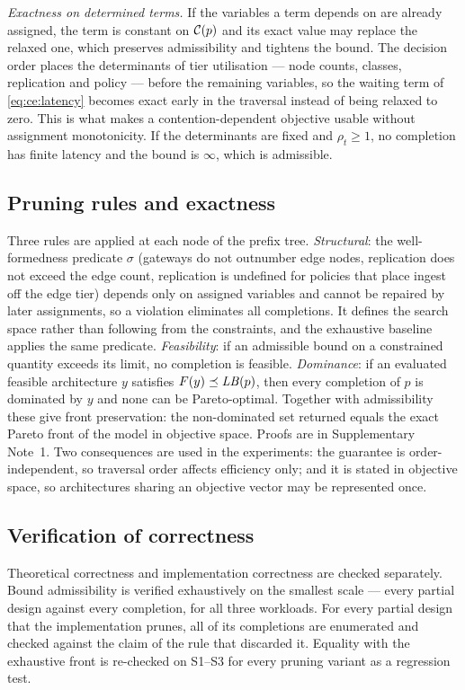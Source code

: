 \emph{Exactness on determined terms.} If the variables a term depends on are already
assigned, the term is constant on $\mathcal{C}(p)$ and its exact value may replace the relaxed
one, which preserves admissibility and tightens the bound. The decision order places the
determinants of tier utilisation --- node counts, classes, replication and policy ---
before the remaining variables, so the waiting term of \eqref{eq:ce:latency} becomes
exact early in the traversal instead of being relaxed to zero. This is what makes a
contention-dependent objective usable without assignment monotonicity. If the
determinants are fixed and $\rho_t\ge1$, no completion has finite latency and the bound
is $\infty$, which is admissible.

\subsection*{Pruning rules and exactness}
Three rules are applied at each node of the prefix tree. \emph{Structural}: the
well-formedness predicate $\sigma$ (gateways do not outnumber edge nodes, replication
does not exceed the edge count, replication is undefined for policies that place ingest
off the edge tier) depends only on assigned variables and cannot be repaired by later
assignments, so a violation eliminates all completions. It defines the search space
rather than following from the constraints, and the exhaustive baseline applies the same
predicate. \emph{Feasibility}: if an admissible bound on a constrained quantity exceeds
its limit, no completion is feasible. \emph{Dominance}: if an evaluated feasible
architecture $y$ satisfies $F(y)\preceq \mathit{LB}(p)$, then every completion of $p$ is
dominated by $y$ and none can be Pareto-optimal. Together with admissibility these give
front preservation: the non-dominated set returned equals the exact Pareto front of the
model in objective space. Proofs are in Supplementary Note~1. Two consequences are used
in the experiments: the guarantee is order-independent, so traversal order affects
efficiency only; and it is stated in objective space, so architectures sharing an
objective vector may be represented once.

\subsection*{Verification of correctness}
Theoretical correctness and implementation correctness are checked separately. Bound
admissibility is verified exhaustively on the smallest scale --- every partial design
against every completion, for all three workloads. For every partial design that the
implementation prunes, all of its completions are enumerated and checked against the
claim of the rule that discarded it. Equality with the exhaustive front is re-checked on
S1--S3 for every pruning variant as a regression test.

